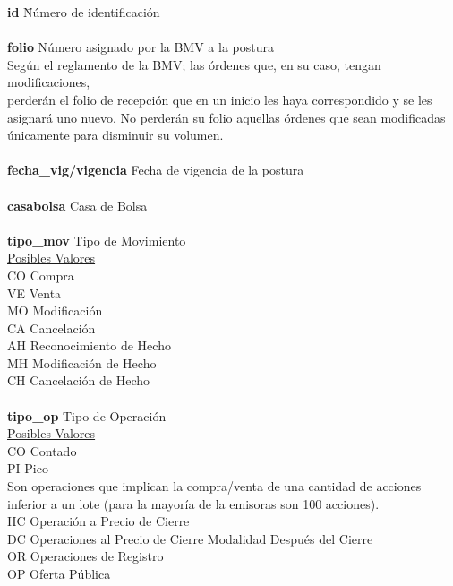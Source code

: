 \documentclass[11pt]{article}
\numberwithin{equation}{section} %
\begin{document}
\noindent
\begin{tabbing}
\textbf{id} \hspace{3cm} \= Número de identificación \hspace{1cm} \= \\
\\
\textbf{folio} \> Número asignado por la BMV a la postura\\
Según el reglamento de la BMV; las órdenes que, en su caso, tengan modificaciones,\\
perderán el folio de recepción que en un inicio les haya correspondido y se les\\
asignará uno nuevo. No perderán su folio aquellas órdenes que sean modificadas\\
únicamente para disminuir su volumen.\\
\\
\textbf{fecha\_vig/vigencia} \> Fecha de vigencia de la postura \\
\\
\textbf{casabolsa} \> Casa de Bolsa\\
\\
\textbf{tipo\_mov} \> Tipo de Movimiento\\
\underline{Posibles Valores} \\
CO \> Compra\\
VE \> Venta\\
MO \> Modificación\\
CA \> Cancelación\\
AH \> Reconocimiento de Hecho\\
MH \> Modificación de Hecho\\
CH \> Cancelación de Hecho\\
\\
\textbf{tipo\_op} \> Tipo de Operación\\
\underline{Posibles Valores} \\
CO \> Contado\\
PI \> Pico\\
Son operaciones que implican la compra/venta de una cantidad de acciones\\
inferior a un lote (para la mayoría de la emisoras son 100 acciones).\\
HC \> Operación a Precio de Cierre\\
DC \> Operaciones al Precio de Cierre Modalidad Después del Cierre\\
OR \> Operaciones de Registro\\
OP \> Oferta Pública\\

\end{tabbing}
\end{document}
